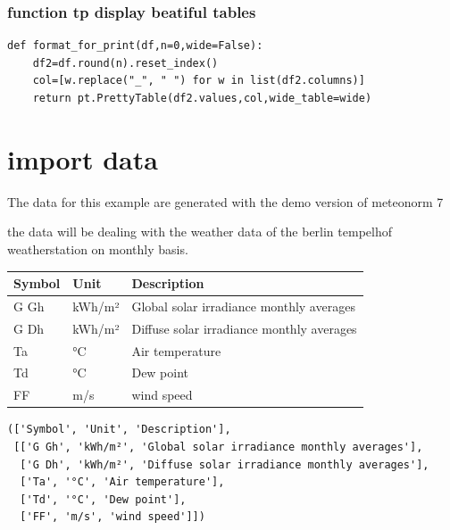 \documentclass[reprint, floatfix, groupaddress, prb]{article}
\begin{document}
    \hypertarget{function-tp-display-beatiful-tables}{%
\subsubsection{function tp display beatiful
tables}\label{function-tp-display-beatiful-tables}}

    \begin{verbatim}
def format_for_print(df,n=0,wide=False):
    df2=df.round(n).reset_index()
    col=[w.replace("_", " ") for w in list(df2.columns)]
    return pt.PrettyTable(df2.values,col,wide_table=wide)
\end{verbatim}

    

    \hypertarget{import-data}{%
\section{import data}\label{import-data}}

    The data for this example are generated with the demo version of
meteonorm 7

the data will be dealing with the weather data of the berlin tempelhof
weatherstation on monthly basis.

    
        
    \begin{table}[ht] 
\begin{tabular}[l]{lll}
\toprule
Symbol & Unit & Description\\ 
\midrule
G Gh & kWh/m² & Global solar irradiance monthly averages\\ 
G Dh & kWh/m² & Diffuse solar irradiance monthly averages\\ 
Ta & °C & Air temperature\\ 
Td & °C & Dew point\\ 
FF & m/s & wind speed\\ 
\bottomrule 
 \end{tabular}
\end{table}

    
    

    
        
    
    \begin{verbatim}
(['Symbol', 'Unit', 'Description'],
 [['G Gh', 'kWh/m²', 'Global solar irradiance monthly averages'],
  ['G Dh', 'kWh/m²', 'Diffuse solar irradiance monthly averages'],
  ['Ta', '°C', 'Air temperature'],
  ['Td', '°C', 'Dew point'],
  ['FF', 'm/s', 'wind speed']])
    \end{verbatim}
\end{document}

